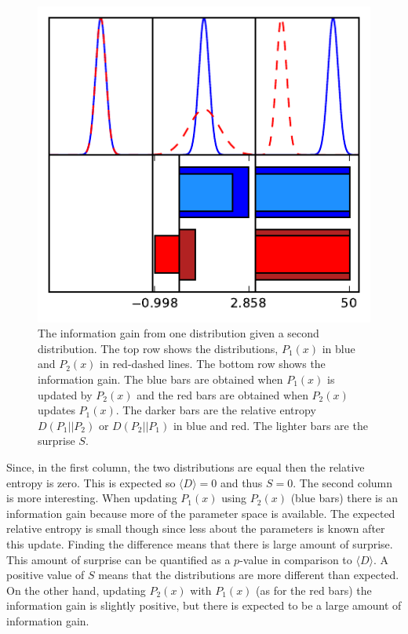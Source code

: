 \documentclass[twocolumn]{revtex4-1}
\begin{document}
    \begin{figure}
        \centering
        \includegraphics{../comparison/plots/surprise.pdf}
        \caption{The information gain from one distribution given a second distribution.
                 The top row shows the distributions, $P_1(x)$ in blue and $P_2(x)$ in red-dashed lines.
                 The bottom row shows the information gain.
                 The blue bars are obtained when $P_1(x)$ is updated by $P_2(x)$ and the red bars are obtained when $P_2(x)$ updates $P_1(x)$.
                 The darker bars are the relative entropy $D(P_1||P_2)$ or $D(P_2||P_1)$ in blue and red.
                 The lighter bars are the surprise $S$.}
        \label{fig:surprise}
    \end{figure}
    \noindent Since, in the first column, the two distributions are equal then the relative entropy is zero.
    This is expected so $\langle D\rangle = 0$ and thus $S = 0$.
    The second column is more interesting.
    When updating $P_1(x)$ using $P_2(x)$ (blue bars) there is an information gain because more of the parameter space is available.
    The expected relative entropy is small though since less about the parameters is known after this update.
    Finding the difference means that there is large amount of surprise.
    This amount of surprise can be quantified as a $p$-value in comparison to $\langle D\rangle$.
    A positive value of $S$ means that the distributions are more different than expected.
    On the other hand, updating $P_2(x)$ with $P_1(x)$ (as for the red bars) the information gain is slightly positive, but there is expected to be a large amount of information gain.
\end{document}

